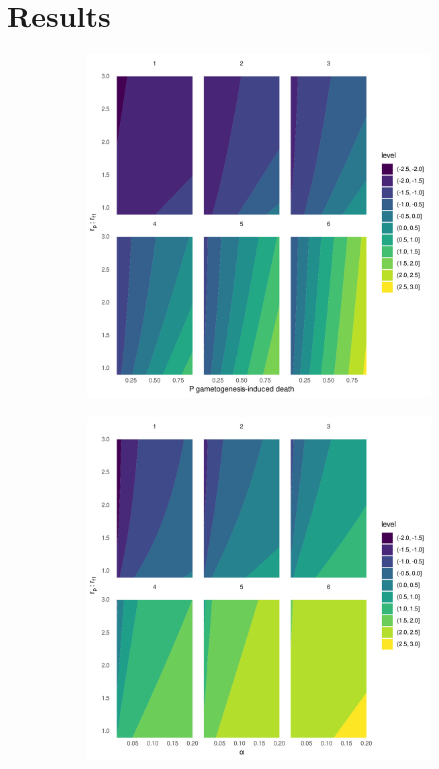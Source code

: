 \documentclass[a4paper,oneside]{book}
\begin{document}
  \section*{Results}
    \begin{figure}[h]
      \centering
      \begin{subfigure}{0.45\textwidth}
        \includegraphics[width=\linewidth]{imgs/a.pdf}
      \end{subfigure}
      \begin{subfigure}{0.45\textwidth}
        \includegraphics[width=\linewidth]{imgs/b.pdf}
      \end{subfigure}
      

\end{figure}
\end{document}
